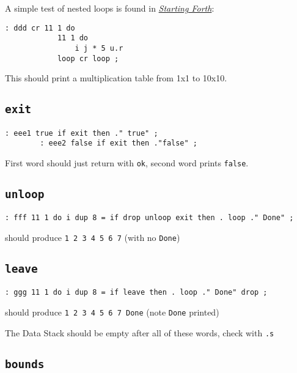 \noindent A simple test of nested loops is found in
\href{https://www.forth.com/starting-forth/6-forth-do-loops/}{\textit{Starting
Forth}}:

\begin{lstlisting}[frame=lines]
        : ddd cr 11 1 do
            11 1 do 
                i j * 5 u.r 
            loop cr loop ;
\end{lstlisting}

\noindent This should print a multiplication table from 1x1 to 10x10.

\subsection{\texttt{exit}}

\begin{lstlisting}[frame=lines]
        : eee1 true if exit then ." true" ; 
        : eee2 false if exit then ."false" ; 
\end{lstlisting}

\noindent First word should just return with \texttt{ok}, second word prints \texttt{false}.


\subsection{\texttt{unloop}}

\begin{lstlisting}[frame=lines]
        : fff 11 1 do i dup 8 = if drop unloop exit then . loop ." Done" ; 
\end{lstlisting}

\noindent should produce \texttt{1 2 3 4 5 6 7} (with no \texttt{Done})


\subsection{\texttt{leave}}

\begin{lstlisting}[frame=lines]
        : ggg 11 1 do i dup 8 = if leave then . loop ." Done" drop ; 
\end{lstlisting}

\noindent should produce \texttt{1 2 3 4 5 6 7 Done} (note \texttt{Done} printed)

The Data Stack should be empty after all of these words, check with \texttt{.s}

\subsection{\texttt{bounds}} 

